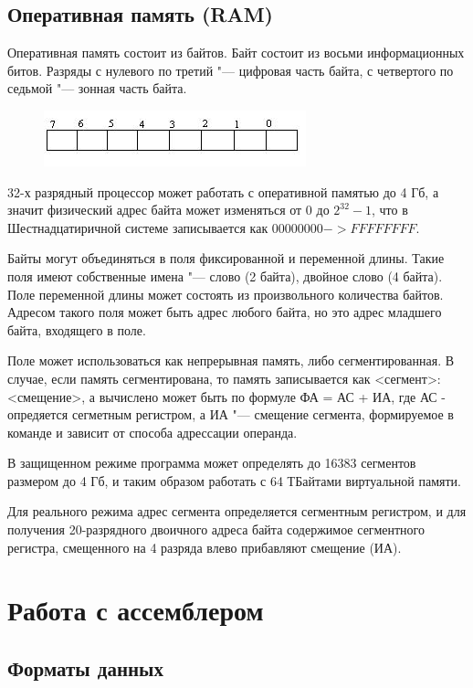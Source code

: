 \subsection{Оперативная память (RAM)}

Оперативная память состоит из байтов. Байт состоит из восьми информационных битов. Разряды с нулевого по третий "---
цифровая часть байта, с четвертого по седьмой "--- зонная часть байта.
\begin{figure}[H]
    \centering
    \includegraphics[scale = 0.5]{ram.jpg}
\end{figure}
32-х разрядный процессор может работать с оперативной памятью до 4 Гб, а значит физический адрес байта может изменяться от 
0 до $2^32 - 1$, что в Шестнадцатиричной системе записывается как $00000000 -> FFFFFFFF$.

Байты могут объединяться в поля фиксированной и переменной длины. Такие поля имеют собственные имена "--- слово (2 байта), двойное слово (4 байта).
Поле переменной длины может состоять из произвольного количества байтов. Адресом такого поля может быть адрес любого байта,
но это адрес младшего байта, входящего в поле.

Поле может использоваться как непрерывная память, либо сегментированная. В случае, если память сегментирована, то память
записывается как <сегмент>: <смещение>, а вычислено может быть по формуле ФА = АС + ИА, где АС - опредяется сегметным регистром,
а ИА "--- смещение сегмента, формируемое в команде и зависит от способа адрессации операнда.

В защищенном режиме программа может определять до 16383 сегментов размером до 4 Гб, и таким образом работать с 
64 ТБайтами виртуальной памяти.

Для реального режима адрес сегмента определяется сегментным регистром, и для получения 20-разрядного двоичного адреса
байта содержимое сегментного регистра, смещенного на 4 разряда влево прибавляют смещение (ИА).

\section{Работа с ассемблером}
\subsection{Форматы данных}


